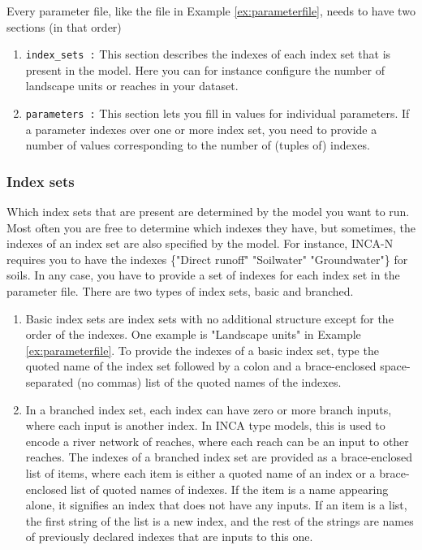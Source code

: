 \documentclass[11pt]{article}
\theoremstyle{definition}
\begin{document}
Every parameter file, like the file in Example \ref{ex:parameterfile}, needs to have two sections (in that order)
\begin{enumerate}[i]
\item {\tt index\_sets :} This section describes the indexes of each index set that is present in the model. Here you can for instance configure the number of landscape units or reaches in your dataset.
\item {\tt parameters :} This section lets you fill in values for individual parameters. If a parameter indexes over one or more index set, you need to provide a number of values corresponding to the number of (tuples of) indexes.
\end{enumerate}

\subsubsection{Index sets}
Which index sets that are present are determined by the model you want to run. Most often you are free to determine which indexes  they have, but sometimes, the indexes of an index set are also specified by the model. For instance, INCA-N requires you to have the indexes \{"Direct runoff" "Soilwater" "Groundwater"\} for soils. In any case, you have to provide a set of indexes for each index set in the parameter file. There are two types of index sets, basic and branched.
\begin{enumerate}[i]
\item Basic index sets are index sets with no additional structure except for the order of the indexes. One example is "Landscape units" in Example \ref{ex:parameterfile}. To provide the indexes of a basic index set, type the quoted name of the index set followed by a colon and a brace-enclosed space-separated (no commas) list of the quoted names of the indexes.
\item In a branched index set, each index can have zero or more branch inputs, where each input is another index. In INCA type models, this is used to encode a river network of reaches, where each reach can be an input to other reaches. The indexes of a branched index set are provided as a brace-enclosed list of items, where each item is either a quoted name of an index or a brace-enclosed list of quoted names of indexes. If the item is a name appearing alone, it signifies an index that does not have any inputs. If an item is a list, the first string of the list is a new index, and the rest of the strings are names of previously declared indexes that are inputs to this one.
\end{enumerate}
\end{document}
